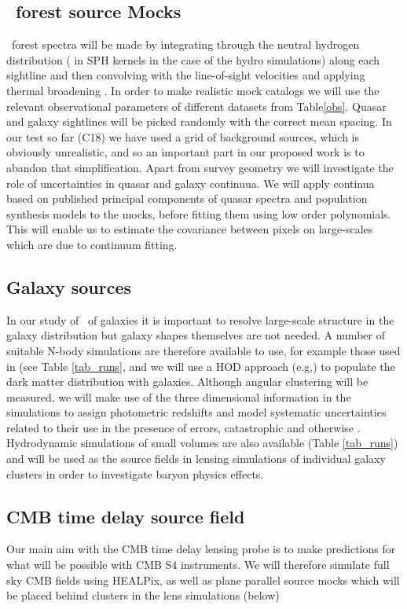 \subsection{\lya\ forest source Mocks}
\lya\ forest spectra will be made by integrating through the
neutral hydrogen distribution ( in SPH kernels in the case of the hydro
simulations)
along each sightline and then convolving with the line-of-sight velocities
and applying thermal broadening \citep{hernquist1996}.
 In order to make realistic
mock catalogs we will use the relevant observational parameters
of different datasets from Table\ref{obs}. Quasar and galaxy sightlines will
be picked randomly with the correct mean spacing. In our test so far
(C18) we have used a grid of background sources, which is obviously
unrealistic, and so an important part in our proposed work is to abandon
that simplification. Apart from survey geometry we will investigate
the role of uncertainties in  quasar and galaxy continuua. We will 
apply continua based on published principal components
of quasar spectra \citep{leedr9} and population synthesis models
to the mocks, before fitting them using low order polynomials. This will
enable us to estimate the covariance between pixels on large-scales which
are due to continuum fitting.


\subsection{Galaxy sources}
\label{galaxysourcesims}
In our study of \atf\ of galaxies
 it is important to resolve large-scale structure
in the galaxy distribution but galaxy shapes themselves are not needed.
A number of suitable N-body simulations are therefore 
available to use, for example
those used in \cite{zhu2017} (see Table \ref{tab_runs}, and we will use a HOD 
approach (e.g,) to populate the dark matter distribution with galaxies.
Although angular clustering will be measured, we will make use of the 
three dimensional information in the simulations to assign photometric
redshifts and model systematic uncertainties related to their use in 
the presence of errors, catastrophic and otherwise \citep{hearin2010}.
Hydrodynamic simulations of small volumes are also available 
(Table \ref{tab_runs}) and
will be used as the source fields in lensing simulations of individual
galaxy clusters in order to investigate baryon physics effects.

\subsection{CMB time delay source field}
Our main aim with the CMB time delay lensing probe is to make predictions
for what will be possible with CMB S4 instruments. We will therefore
simulate full sky CMB fields using HEALPix, as well as plane parallel
source mocks which will be placed behind clusters in the lens simulations
(below)


